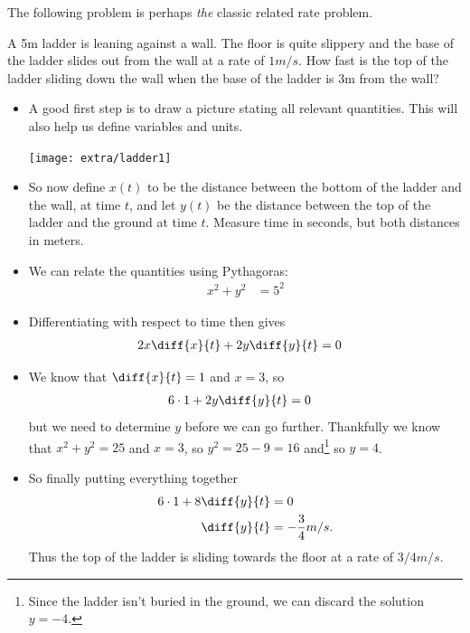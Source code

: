The following problem is perhaps \emph{the} classic related rate problem.
\begin{eg}\label{eg_3_2_2}
 A 5m ladder is leaning against a wall. The floor is quite slippery and the
base of the ladder slides out from the wall at a rate of $1m/s$. How fast is
the top of the ladder sliding down the wall when the base of the ladder is 3m
from the wall?

\begin{itemize}
 \item A good first step is to draw a picture stating all relevant quantities.
This will also help us define variables and units.
\begin{efig}
\begin{center} \texttt{[image: extra/ladder1]}
\end{center}

\end{efig}
 \item So now define $x(t)$ to be the distance between the bottom of the ladder and the
wall, at time $t$, and let $y(t)$ be the distance between the top of the ladder and the
ground at time $t$. Measure time in seconds, but both distances in meters.

\item We can relate the quantities using Pythagoras:
\begin{align*}
  x^2 + y^2 &= 5^2
\end{align*}
\item Differentiating with respect to time then gives
\begin{align*}
  2x \diff{x}{t} + 2y \diff{y}{t} &= 0
\end{align*}
\item We know that $\diff{x}{t} = 1$ and $x=3$, so
\begin{align*}
  6 \cdot 1 + 2y \diff{y}{t} &= 0
\end{align*}
but we need to determine $y$ before we can go further. Thankfully we know that
$x^2+y^2=25$ and $x=3$, so $y^2=25-9=16$ and\footnote{Since the ladder
isn't buried in the ground, we can discard the solution $y=-4$.} so $y=4$.
\item So finally putting everything together
\begin{align*}
  6 \cdot 1 + 8 \diff{y}{t} &= 0 \\
  \diff{y}{t} &= - \frac{3}{4} m/s.
\end{align*}
Thus the top of the ladder is sliding towards the floor at a rate of $3/4 m/s$.
\end{itemize}

\end{eg}

